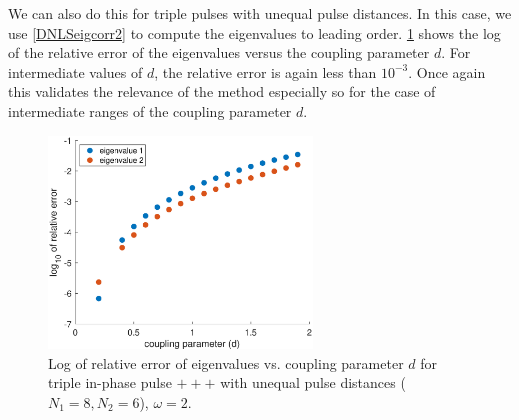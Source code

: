\documentclass[thesis.tex]{subfiles}
\begin{document}
We can also do this for triple pulses with unequal pulse distances. In this case, we use \cref{DNLSeigcorr2} to compute the eigenvalues to leading order. \cref{fig:error2} shows the log of the relative error of the eigenvalues versus the coupling parameter $d$.
For intermediate values of $d$, the relative error is again less than $10^{-3}$. Once again this validates the relevance
of the method especially so for the case of 
intermediate ranges of the coupling parameter $d$.

\begin{figure}
\centering
\includegraphics[width=7cm]{images/other/errors3.eps}
\caption[Error plot for eigenvalue computations for asymmetric multi-pulses in DNLS]{Log of relative error of eigenvalues vs. coupling parameter $d$ for triple in-phase pulse $+++$ with unequal pulse distances ($N_1 = 8, N_2 = 6$), $\omega = 2$.}
\label{fig:error2}
\end{figure}

\iffulldocument\else
	
	
\fi
\end{document}
